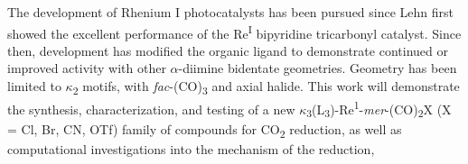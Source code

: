 The development of Rhenium I photocatalysts has been pursued since Lehn first showed the excellent performance of the Re\textsuperscript{I} bipyridine tricarbonyl catalyst. Since then, development has modified the organic ligand to demonstrate continued or improved activity with other $\alpha$-diimine bidentate geometries. Geometry has been limited to $\kappa$\textsubscript{2} motifs, with \textit{fac}-(CO)\textsubscript{3} and axial halide. This work will demonstrate the synthesis, characterization, and testing of a new $\kappa$\textsubscript{3}(L\textsubscript{3})-Re\textsuperscript{1}-\textit{mer}-(CO)\textsubscript{2}X (X = Cl, Br, CN, OTf) family of compounds for CO\textsubscript{2} reduction, as well as computational investigations into the mechanism of the reduction,
